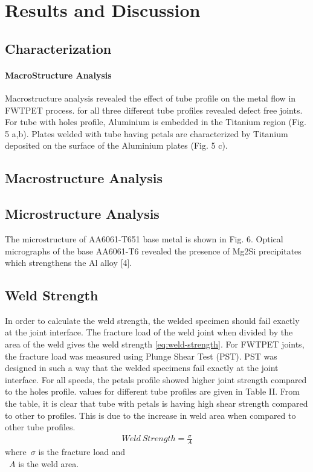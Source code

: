 \documentclass[3p]{elsarticle}
\begin{document}
\section{Results and Discussion}
\label{sec:Results and Discussion}

\subsection{Characterization}
\label{subsec:Characterization}
\paragraph{MacroStructure Analysis}
Macrostructure analysis revealed the effect of tube profile on the metal flow in FWTPET process. for all three different tube profiles revealed defect free joints. For tube with holes profile, Aluminium is embedded in the Titanium region (Fig. 5 a,b). Plates welded with tube having petals are characterized by Titanium deposited on the surface of the Aluminium plates (Fig. 5 c).


\subsection{Macrostructure Analysis}
\label{subsec:Macrostructure Analysis}

\subsection{Microstructure Analysis}
\label{subsec:Microstructure Analysis}
The microstructure of AA6061-T651 base metal is shown in Fig. 6. Optical micrographs of the base AA6061-T6 revealed the presence of Mg2Si precipitates which strengthens the Al alloy [4].

\subsection{Weld Strength}
\label{subsec:Weld Strength}
In order to calculate the weld strength, the welded specimen should fail exactly at the joint interface. The fracture load of the weld joint when divided by the area of the weld gives the weld strength \ref{eq:weld-strength}. For FWTPET joints, the fracture load was measured using Plunge Shear Test (PST). PST was designed in such a way that the welded specimens fail exactly at the joint interface. For all speeds, the petals profile showed higher joint strength compared to the holes profile.  values for different tube profiles are given in Table II. From the table, it is clear that tube with petals is having high shear strength compared to other to profiles. This is due to the increase in weld area when compared to other tube profiles.
\begin{gather} \label{eq:weld-strength}
Weld\:Strength = \frac{\sigma}{A}
\end{gather}
where~$\sigma$ is the fracture load and \\
~$A$ is the weld area.
\end{document}
